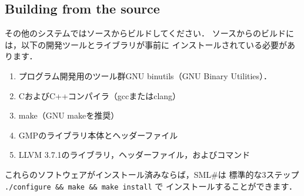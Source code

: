 \documentclass{jbook}
\newif\ifjp
\newcommand{\txt}[2]{#2}
\newcommand{\smlsharp}{SML\#}
\newenvironment{program}{\begin{quote}\begin{tt}}%
                        {\end{tt}\end{quote}}
\begin{document}
%
%
%
%
%

\subsection{\txt{ソースからビルドする場合}{Building from the source}}
\ifjp%
	その他のシステムではソースからビルドしてください．
	ソースからのビルドには，以下の開発ツールとライブラリが事前に
インストールされている必要があります．
\begin{enumerate}
\item プログラム開発用のツール群GNU binutils（GNU Binary Utilities）．
\item CおよびC++コンパイラ（gccまたはclang）
\item make（GNU makeを推奨）
\item GMPのライブラリ本体とヘッダーファイル
\item LLVM 3.7.1のライブラリ，ヘッダーファイル，およびコマンド
\end{enumerate}
	これらのソフトウェアがインストール済みならば，\smlsharp{}は
標準的な3ステップ {\tt ./configure \&\& make \&\& make install} で
インストールすることができます．
\end{document}
